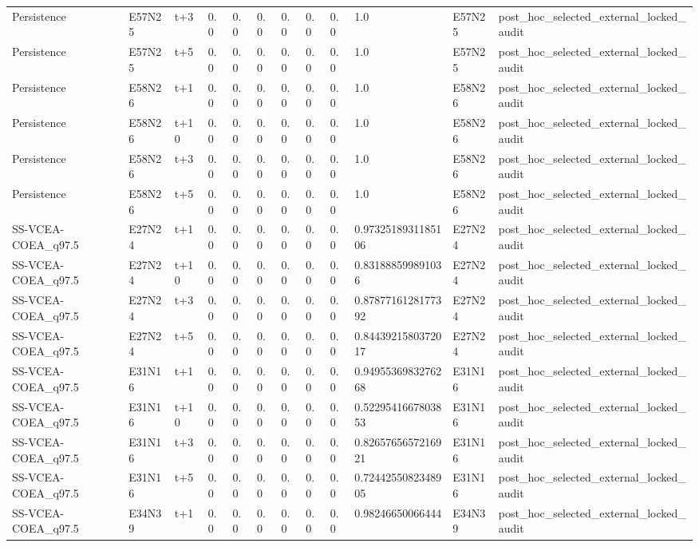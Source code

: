 \begin{landscape}
\begin{longtable}{llllllllllll}
Persistence & E57N25 & t+3 & 0.0 & 0.0 & 0.0 & 0.0 & 0.0 & 0.0 & 1.0 & E57N25 & post\_hoc\_selected\_external\_locked\_audit \\
Persistence & E57N25 & t+5 & 0.0 & 0.0 & 0.0 & 0.0 & 0.0 & 0.0 & 1.0 & E57N25 & post\_hoc\_selected\_external\_locked\_audit \\
Persistence & E58N26 & t+1 & 0.0 & 0.0 & 0.0 & 0.0 & 0.0 & 0.0 & 1.0 & E58N26 & post\_hoc\_selected\_external\_locked\_audit \\
Persistence & E58N26 & t+10 & 0.0 & 0.0 & 0.0 & 0.0 & 0.0 & 0.0 & 1.0 & E58N26 & post\_hoc\_selected\_external\_locked\_audit \\
Persistence & E58N26 & t+3 & 0.0 & 0.0 & 0.0 & 0.0 & 0.0 & 0.0 & 1.0 & E58N26 & post\_hoc\_selected\_external\_locked\_audit \\
Persistence & E58N26 & t+5 & 0.0 & 0.0 & 0.0 & 0.0 & 0.0 & 0.0 & 1.0 & E58N26 & post\_hoc\_selected\_external\_locked\_audit \\
SS-VCEA-COEA\_q97.5 & E27N24 & t+1 & 0.0 & 0.0 & 0.0 & 0.0 & 0.0 & 0.0 & 0.9732518931185106 & E27N24 & post\_hoc\_selected\_external\_locked\_audit \\
SS-VCEA-COEA\_q97.5 & E27N24 & t+10 & 0.0 & 0.0 & 0.0 & 0.0 & 0.0 & 0.0 & 0.831888599891036 & E27N24 & post\_hoc\_selected\_external\_locked\_audit \\
SS-VCEA-COEA\_q97.5 & E27N24 & t+3 & 0.0 & 0.0 & 0.0 & 0.0 & 0.0 & 0.0 & 0.8787716128177392 & E27N24 & post\_hoc\_selected\_external\_locked\_audit \\
SS-VCEA-COEA\_q97.5 & E27N24 & t+5 & 0.0 & 0.0 & 0.0 & 0.0 & 0.0 & 0.0 & 0.8443921580372017 & E27N24 & post\_hoc\_selected\_external\_locked\_audit \\
SS-VCEA-COEA\_q97.5 & E31N16 & t+1 & 0.0 & 0.0 & 0.0 & 0.0 & 0.0 & 0.0 & 0.9495536983276268 & E31N16 & post\_hoc\_selected\_external\_locked\_audit \\
SS-VCEA-COEA\_q97.5 & E31N16 & t+10 & 0.0 & 0.0 & 0.0 & 0.0 & 0.0 & 0.0 & 0.5229541667803853 & E31N16 & post\_hoc\_selected\_external\_locked\_audit \\
SS-VCEA-COEA\_q97.5 & E31N16 & t+3 & 0.0 & 0.0 & 0.0 & 0.0 & 0.0 & 0.0 & 0.8265765657216921 & E31N16 & post\_hoc\_selected\_external\_locked\_audit \\
SS-VCEA-COEA\_q97.5 & E31N16 & t+5 & 0.0 & 0.0 & 0.0 & 0.0 & 0.0 & 0.0 & 0.7244255082348905 & E31N16 & post\_hoc\_selected\_external\_locked\_audit \\
SS-VCEA-COEA\_q97.5 & E34N39 & t+1 & 0.0 & 0.0 & 0.0 & 0.0 & 0.0 & 0.0 & 0.98246650066444 & E34N39 & post\_hoc\_selected\_external\_locked\_audit \\

\end{longtable}
\end{landscape}
